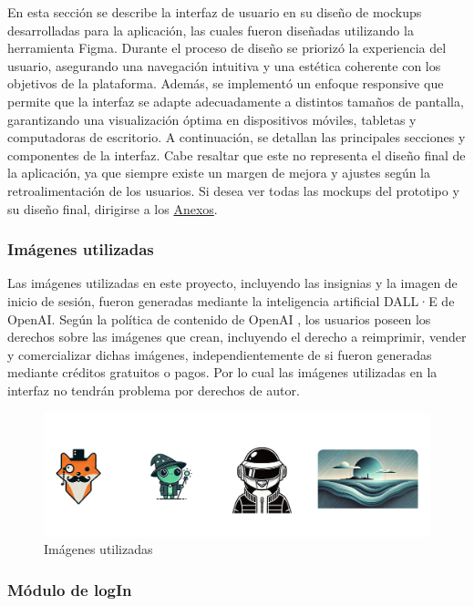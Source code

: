 En esta sección se describe la interfaz de usuario en su diseño de mockups desarrolladas para la aplicación, las cuales fueron diseñadas utilizando la herramienta Figma. Durante el proceso de diseño se priorizó la experiencia del usuario, asegurando una navegación intuitiva y una estética coherente con los objetivos de la plataforma. Además, se implementó un enfoque responsive que permite que la interfaz se adapte adecuadamente a distintos tamaños de pantalla, garantizando una visualización óptima en dispositivos móviles, tabletas y computadoras de escritorio. A continuación, se detallan las principales secciones y componentes de la interfaz. Cabe resaltar que este no representa el diseño final de la aplicación, ya que siempre existe un margen de mejora y ajustes según la retroalimentación de los usuarios. Si desea ver todas las mockups del prototipo y su diseño final, dirigirse a los \hyperref[Anexos]{Anexos}.

\newpage
\subsubsection{Imágenes utilizadas}

Las imágenes utilizadas en este proyecto, incluyendo las insignias y la imagen de inicio de sesión, fueron generadas mediante la inteligencia artificial DALL·E de OpenAI. Según la política de contenido de OpenAI \cite{openaicondicionesuso}, los usuarios poseen los derechos sobre las imágenes que crean, incluyendo el derecho a reimprimir, vender y comercializar dichas imágenes, independientemente de si fueron generadas mediante créditos gratuitos o pagos. Por lo cual las imágenes utilizadas en la interfaz no tendrán problema por derechos de autor.

\begin{figure}[H]
  \centering
  \includegraphics[width=0.8\linewidth]{Imagenes/Imagenes IA.png}
  \caption{Imágenes utilizadas}
  \label{fig:ER}
\end{figure}

\subsubsection{Módulo de logIn}

